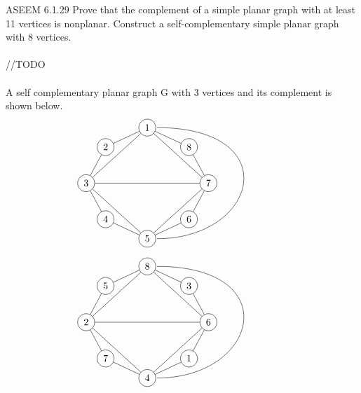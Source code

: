 \documentclass[12pt]{article}
\newenvironment{question}[2][Question]{\begin{trivlist}
\item[\hskip \labelsep {\bfseries #1}\hskip \labelsep {\bfseries #2.}]}{\end{trivlist}}
\begin{document}
\begin{question}{3} \color{blue} ASEEM \color{black}
 6.1.29  Prove that the complement of a simple planar graph with at least 11 vertices is nonplanar.  Construct a self-complementary simple planar graph with 8 vertices. \\
\\ //TODO \\
\\ A self complementary planar graph G with 3 vertices and its complement is shown below.
\begin{align*}
\begin{tikzpicture}
\node[shape=circle,draw=black] (1) at (2,1) {1};
\node[shape=circle,draw=black] (2) at (0.5,0.3) {2};
\node[shape=circle,draw=black] (3) at (-0.2,-1) {3};
\node[shape=circle,draw=black] (4) at (0.5,-2.3) {4};
\node[shape=circle,draw=black] (5) at (2,-3) {5};
\node[shape=circle,draw=black] (6) at (3.5,-2.3) {6};
\node[shape=circle,draw=black] (7) at (4.2,-1) {7};
\node[shape=circle,draw=black] (8) at (3.5,0.3) {8};
\path [] (1) edge node[left] {} (2);
\path [] (2) edge node[left] {} (3);
\path [] (3) edge node[left] {} (4);
\path [] (4) edge node[left] {} (5);
\path [] (5) edge node[left] {} (6);
\path [] (6) edge node[left] {} (7);
\path [] (7) edge node[left] {} (8);
\path [] (8) edge node[left] {} (1);
\path [] (1) edge node[left] {} (3);
\path [] (3) edge node[left] {} (5);
\path [] (5) edge node[left] {} (7);
\path [] (7) edge node[left] {} (1);
\path [] (3) edge node[left] {} (7);
\draw (2.35, 1) .. controls (7,1) and (6,-3) .. (2.35, -3);
\end{tikzpicture}
\end{align*}
\begin{align*}
\begin{tikzpicture}
\node[shape=circle,draw=black] (1) at (2,1) {8};
\node[shape=circle,draw=black] (2) at (0.5,0.3) {5};
\node[shape=circle,draw=black] (3) at (-0.2,-1) {2};
\node[shape=circle,draw=black] (4) at (0.5,-2.3) {7};
\node[shape=circle,draw=black] (5) at (2,-3) {4};
\node[shape=circle,draw=black] (6) at (3.5,-2.3) {1};
\node[shape=circle,draw=black] (7) at (4.2,-1) {6};
\node[shape=circle,draw=black] (8) at (3.5,0.3) {3};
\path [] (1) edge node[left] {} (2);
\path [] (2) edge node[left] {} (3);
\path [] (3) edge node[left] {} (4);
\path [] (4) edge node[left] {} (5);
\path [] (5) edge node[left] {} (6);
\path [] (6) edge node[left] {} (7);
\path [] (7) edge node[left] {} (8);
\path [] (8) edge node[left] {} (1);
\path [] (1) edge node[left] {} (3);
\path [] (3) edge node[left] {} (5);
\path [] (5) edge node[left] {} (7);
\path [] (7) edge node[left] {} (1);
\path [] (3) edge node[left] {} (7);
\draw (2.35, 1) .. controls (7,1) and (6,-3) .. (2.35, -3);
\end{tikzpicture}
\end{align*}
\end{question}
\end{document}
